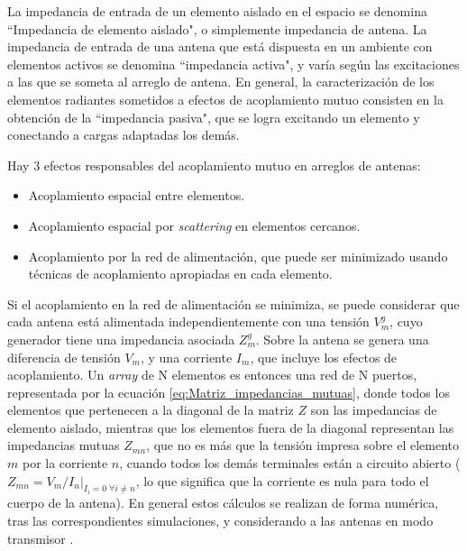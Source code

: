 La impedancia de entrada de un elemento aislado en el espacio se denomina ``Impedancia de elemento aislado", o simplemente impedancia de antena. La impedancia de entrada de una antena que está dispuesta en un ambiente con elementos activos se denomina ``impedancia activa", y varía según las excitaciones a las que se someta al arreglo de antena. En general, la caracterización de los elementos radiantes sometidos a efectos de acoplamiento mutuo consisten en la obtención de la ``impedancia pasiva", que se logra excitando un elemento y conectando a cargas adaptadas los demás.

Hay 3 efectos responsables del acoplamiento mutuo en arreglos de antenas:

\begin{itemize}
	\item Acoplamiento espacial entre elementos.
	\item Acoplamiento espacial por \textit{scattering} en elementos cercanos.
	\item Acoplamiento por la red de alimentación, que puede ser minimizado usando técnicas de acoplamiento apropiadas en cada elemento.
\end{itemize}

Si el acoplamiento en la red de alimentación se minimiza, se puede considerar que cada antena está alimentada independientemente con una tensión $V_m^g$, cuyo generador tiene una impedancia asociada $Z_m^g$. Sobre la antena se genera una diferencia de tensión $V_m$, y una corriente $I_m$, que incluye los efectos de acoplamiento. Un \textit{array} de N elementos es entonces una red de N puertos, representada por la ecuación \ref{eq:Matriz_impedancias_mutuas}, donde todos los elementos que pertenecen a la diagonal de la matriz $Z$ son las impedancias de elemento aislado, mientras que los elementos fuera de la diagonal representan las impedancias mutuas $Z_{mn}$, que no es más que la tensión impresa sobre el elemento $m$ por la corriente $n$, cuando todos los demás terminales están a circuito abierto ($Z_{mn}=V_m/I_n |_{I_i=0\; \forall i \neq n}$, lo que significa que la corriente es nula para todo el cuerpo de la antena). En general estos cálculos se realizan de forma numérica, tras las correspondientes simulaciones, y considerando a las antenas en modo transmisor \cite{Fano:CouplingReceiving}.

